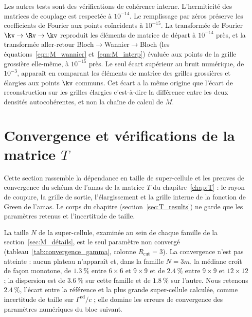Les autres tests sont des vérifications de cohérence interne. L'hermiticité des matrices de couplage est respectée à $10^{-14}$. Le remplissage par zéros préserve les coefficients de Fourier aux points coïncidents à $10^{-15}$. La transformée de Fourier $\kv\to\Rv\to\kv$ reproduit les éléments de matrice de départ à $10^{-14}$ près, et la transformée aller-retour Bloch$\to$Wannier$\to$Bloch (les équations~\eqref{eqn:M_wannier} et~\eqref{eqn:M_interp}) évaluée aux points de la grille grossière elle-même, à $10^{-15}$ près. Le seul écart supérieur au bruit numérique, de $10^{-3}$, apparaît en comparant les éléments de matrice des grilles grossières et élargies aux points $\kv$ communs. Cet écart a la même origine que l'écart de reconstruction sur les grilles élargies c'est-à-dire la différence entre les deux densités autocohérentes, et non la chaîne de calcul de $M$.
\begin{table}[htbp]
    \centering
    \small
    \setlength{\tabcolsep}{2pt}
    \caption[Vérifications de la chaîne de calcul de la matrice de
    couplage.]{Vérifications de la chaîne de calcul de la matrice $M$ : les tests et la quantité qu'ils contrôlent, la valeur obtenue et le seuil d'acceptation. Sauf mention contraire la valeur est celle de la super-cellule de référence $9\times9$ ; les reconstructions de Kohn-Sham, l'hermiticité et l'application directe de $V_\text{ed}$ sont données en fourchette ou en maximum sur les six tailles, et le test de convention intensive porte sur chaque famille de tailles.}
    \label{tab:tests_M}
    
\end{table}

\section{Convergence et vérifications de la matrice $T$}\label{sec:annexe_T_tests}

Cette section rassemble la dépendance en taille de super-cellule et les preuves de convergence du schéma de l'amas de la matrice $T$ du chapitre~\ref{chap:T} : le rayon de coupure, la grille de sortie, l'élargissement et la grille interne de la fonction de Green de l'amas. Le corps du chapitre (section~\ref{sec:T_results}) ne garde que les paramètres retenus et l'incertitude de taille.


La taille $N$ de la super-cellule, examinée au sein de chaque famille de la section~\ref{sec:M_détails}, est le seul paramètre non convergé (tableau~\ref{tab:convergence_gamma}, colonne $R_\text{cut}=3$). La convergence n'est pas atteinte : aucun plateau n'apparaît et, dans la famille $N=3m$, la médiane croît de façon monotone, de $1.3~\%$ entre $6\times6$ et $9\times9$ et de $2.4~\%$ entre $9\times9$ et $12\times12$ ; la dispersion est de $3.6~\%$ sur cette famille et de $1.8~\%$ sur l'autre. Nous retenons $2.4~\%$, l'écart entre la référence et la plus grande super-cellule calculée, comme incertitude de taille sur $\Gamma^\text{ed}/c$ ; elle domine les erreurs de convergence des paramètres numériques du bloc suivant.

